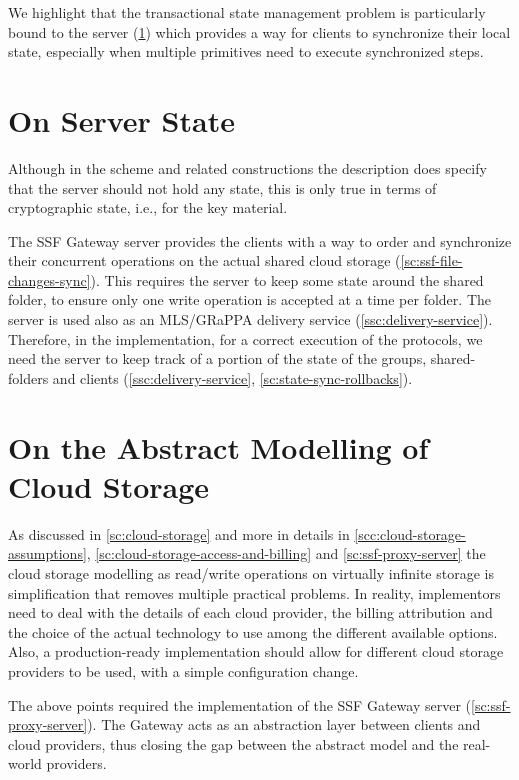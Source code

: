 We highlight that the transactional state management problem
is particularly bound to the server 
(\cref{sc:gap-synchronization-server-state})
which provides a way for clients to synchronize
their local state,
especially when multiple primitives need to execute
synchronized steps.


\section{On Server State}\label{sc:gap-synchronization-server-state}

Although in the scheme and related constructions the description
does specify that the server should not hold any state,
this is only true in terms of cryptographic state, i.e., for
the key material.

The SSF Gateway server provides the clients with a way to order and synchronize
their concurrent operations on the actual shared cloud storage (\cref{sc:ssf-file-changes-sync}).
This requires the server to keep some state around the shared folder,
to ensure only one write operation is accepted at a time per folder.
The server is used also as an MLS/GRaPPA delivery service (\cref{ssc:delivery-service}).
Therefore, in the implementation, for a correct execution of the protocols, 
we need the server
to keep track of a portion of the state of the groups, 
shared-folders and clients (\cref{ssc:delivery-service}, \cref{sc:state-sync-rollbacks}).


\section{On the Abstract Modelling of Cloud Storage}\label{sc:gap-abstract-cloud-storage}

As discussed in \cref{sc:cloud-storage} and more in details in 
\cref{scc:cloud-storage-assumptions},
\cref{sc:cloud-storage-access-and-billing}
and \cref{sc:ssf-proxy-server} the cloud storage modelling
as read/write operations on virtually infinite storage
is simplification that removes multiple practical problems. 
In reality, implementors need to
deal with the details of each cloud provider, the billing attribution
and the choice of the actual technology to use among
the different available options.
Also, a production-ready
implementation should allow for different cloud storage
providers to be used, with a simple configuration change.

The above points required the implementation of the
SSF Gateway server (\cref{sc:ssf-proxy-server}).
The Gateway acts as an abstraction layer between clients
and cloud providers, thus closing the gap
between the abstract model and the real-world providers.


